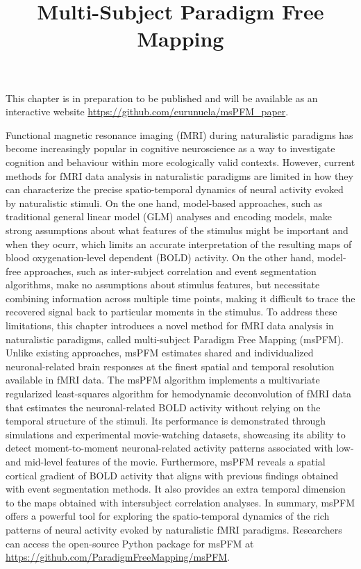 \title{Multi-Subject Paradigm Free Mapping}
\label{cha:multi-subject}

\begin{framed}\noindent This chapter is in preparation to be published and will
    be available as an interactive website
    \url{https://github.com/eurunuela/msPFM\_paper}.
\end{framed}

Functional magnetic resonance imaging (fMRI) during naturalistic paradigms has
become increasingly popular in cognitive neuroscience as a way to investigate
cognition and behaviour within more ecologically valid contexts. However,
current methods for fMRI data analysis in naturalistic paradigms are limited in
how they can characterize the precise spatio-temporal dynamics of neural
activity evoked by naturalistic stimuli. On the one hand, model-based
approaches, such as traditional general linear model (GLM) analyses and encoding
models, make strong assumptions about what features of the stimulus might be
important and when they ocurr, which limits an accurate interpretation of the
resulting maps of blood oxygenation-level dependent (BOLD) activity. On the
other hand, model-free approaches, such as inter-subject correlation and event
segmentation algorithms, make no assumptions about stimulus features, but
necessitate combining information across multiple time points, making it
difficult to trace the recovered signal back to particular moments in the
stimulus. To address these limitations, this chapter introduces a novel method
for fMRI data analysis in naturalistic paradigms, called multi-subject
Paradigm Free Mapping (msPFM). Unlike existing approaches, msPFM estimates shared and
individualized neuronal-related brain responses at the finest spatial and
temporal resolution available in fMRI data. The msPFM algorithm implements a
multivariate regularized least-squares algorithm for hemodynamic deconvolution
of fMRI data that estimates the neuronal-related BOLD activity without relying
on the temporal structure of the stimuli. Its performance is demonstrated
through simulations and experimental movie-watching datasets, showcasing its
ability to detect moment-to-moment neuronal-related activity patterns associated
with low- and mid-level features of the movie. Furthermore, msPFM reveals a
spatial cortical gradient of BOLD activity that aligns with previous findings
obtained with event segmentation methods. It also provides an extra temporal
dimension to the maps obtained with intersubject correlation analyses.  
In summary, msPFM offers a powerful tool for exploring the spatio-temporal 
dynamics of the rich patterns of neural activity evoked by naturalistic fMRI paradigms. 
Researchers can access the open-source Python package for msPFM at
\url{https://github.com/ParadigmFreeMapping/msPFM}.

